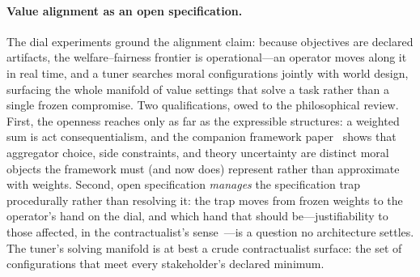 \documentclass[11pt]{article}
\begin{document}
\paragraph{Value alignment as an open specification.} The dial experiments
ground the alignment claim: because objectives are declared artifacts, the
welfare--fairness frontier is operational---an operator moves along it
in real time, and a tuner searches moral configurations jointly with world
design, surfacing the whole manifold of value settings that solve a task rather
than a single frozen compromise. Two qualifications, owed to the
philosophical review. First, the openness reaches only as far as the expressible
structures: a weighted sum is act consequentialism, and
the companion framework paper~\cite{openworld_framework} shows that aggregator choice, side constraints,
and theory uncertainty are distinct moral objects the framework must (and
now does) represent rather than approximate with weights. Second, open
specification \emph{manages} the specification trap~\cite{spectrap2025}
procedurally rather than resolving it: the trap moves from frozen
weights to the operator's hand on the dial, and which hand that should
be---justifiability to those affected, in the contractualist's
sense~\cite{scanlon1998}---is a question no architecture settles. The
tuner's solving manifold is at best a crude contractualist surface: the set
of configurations that meet every stakeholder's declared minimum.
\end{document}
